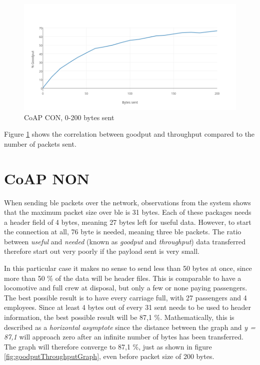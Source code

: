\begin{figure}[ht]
    \centering
    \includegraphics[scale=0.45]{CoAP_CONgraph2.png}    
    \caption{CoAP CON, 0-200 bytes sent}
    \label{fig:coapCON0200}
\end{figure}

Figure \ref{fig:coapCON0200} shows the correlation between goodput and throughput compared to the number of packets sent.

\section{CoAP NON}

When sending \gls{ble} packets over the network, observations from the system shows that the maximum packet size over \gls{ble} is 31 bytes. Each of these packages needs a header field of 4 bytes, meaning 27 bytes left for useful data. However, to start the connection at all, 76 byte is needed, meaning three \gls{ble} packets. The ratio between \textit{useful} and \textit{needed} (known as \textit{goodput} and \textit{throughput}) data transferred therefore start out very poorly if the payload sent is very small. 

In this particular case it makes no sense to send less than 50 bytes at once, since more than 50 \% of the data will be header files. This is comparable to have a locomotive and full crew at disposal, but only a few or none paying passengers. The best possible result is to have every carriage full, with 27 passengers and 4 employees. Since at least 4 bytes out of every 31 sent needs to be used to header information, the best possible result will be 87,1 \%. Mathematically, this is described as a \textit{horizontal asymptote} since the distance between the graph and \textit{y = 87,1} will approach zero after an infinite number of bytes has been transferred. The graph will therefore converge to 87,1 \%, just as shown in figure \ref{fig:goodputThroughputGraph}, even before packet size of 200 bytes.  


